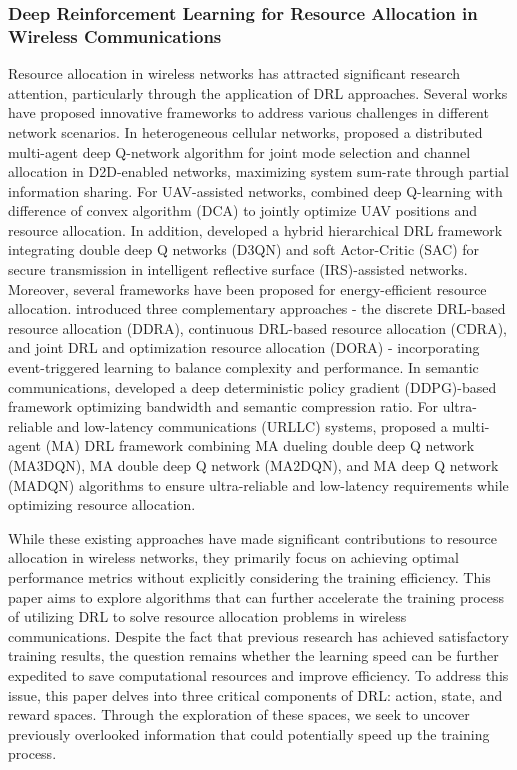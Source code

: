 \documentclass[comsoc,journal]{IEEEtran}
\begin{document}
\subsubsection{Deep Reinforcement Learning for Resource Allocation in Wireless Communications}

Resource allocation in wireless networks has attracted significant research attention, particularly through the application of DRL approaches. Several works have proposed innovative frameworks to address various challenges in different network scenarios. In heterogeneous cellular networks, \cite{zhi2022deep} proposed a distributed multi-agent deep Q-network algorithm for joint mode selection and channel allocation in D2D-enabled networks, maximizing system sum-rate through partial information sharing. For UAV-assisted networks, \cite{luong2021deep} combined deep Q-learning with difference of convex algorithm (DCA) to jointly optimize UAV positions and resource allocation. In addition, \cite{wang2023hybrid} developed a hybrid hierarchical DRL framework integrating double deep Q networks (D3QN) and soft Actor-Critic (SAC) for secure transmission in intelligent reflective surface (IRS)-assisted networks. Moreover,
several frameworks have been proposed for energy-efficient resource allocation. \cite{wang2020drl} introduced three complementary approaches - the discrete DRL-based resource allocation (DDRA), continuous DRL-based resource allocation (CDRA), and joint DRL and optimization resource allocation (DORA) - incorporating event-triggered learning to balance complexity and performance. In semantic communications, \cite{zhang2023drl} developed a deep deterministic policy gradient (DDPG)-based framework optimizing bandwidth and semantic compression ratio. For ultra-reliable and low-latency communications (URLLC) systems, \cite{tran2023multi} proposed a multi-agent (MA) DRL framework combining MA dueling double deep Q network (MA3DQN), MA double deep Q network (MA2DQN), and  MA deep Q network (MADQN) algorithms to ensure ultra-reliable and low-latency requirements while optimizing resource allocation.

While these existing approaches have made significant contributions to resource allocation in wireless networks, they primarily focus on achieving optimal performance metrics without explicitly considering the training efficiency. This paper aims to explore algorithms that can further accelerate the training process of utilizing DRL to solve resource allocation problems in wireless communications. Despite the fact that previous research has achieved satisfactory training results, the question remains whether the learning speed can be further expedited to save computational resources and improve efficiency. To address this issue, this paper delves into three critical components of DRL: action, state, and reward spaces. Through the exploration of these spaces, we seek to uncover previously overlooked information that could potentially speed up the training process.
\end{document}
